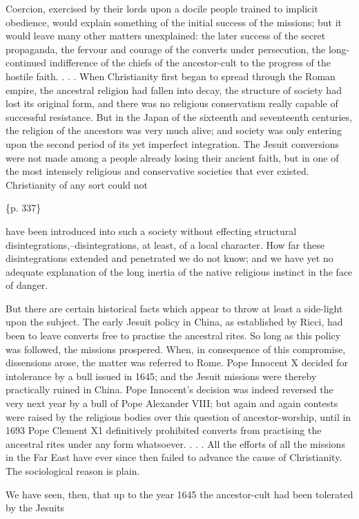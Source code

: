 Coercion, exercised by their lords upon a docile people trained to implicit obedience, would explain something of the initial success of the missions; but it would leave many other matters unexplained: the later success of the secret propaganda, the fervour and courage of the converts under persecution, the long-continued indifference of the chiefs of the ancestor-cult to the progress of the hostile faith. . . . When Christianity first began to spread through the Roman empire, the ancestral religion had fallen into decay, the structure of society had lost its original form, and there was no religious conservatism really capable of successful resistance. But in the Japan of the sixteenth and seventeenth centuries, the religion of the ancestors was very much alive; and society was only entering upon the second period of its yet imperfect integration. The Jesuit conversions were not made among a people already losing their ancient faith, but in one of the most intensely religious and conservative societies that ever existed. Christianity of any sort could not

\{p. 337\}

have been introduced into such a society without effecting structural disintegrations,--disintegrations, at least, of a local character. How far these disintegrations extended and penetrated we do not know; and we have yet no adequate explanation of the long inertia of the native religious instinct in the face of danger.

But there are certain historical facts which appear to throw at least a side-light upon the subject. The early Jesuit policy in China, as established by Ricci, had been to leave converts free to practise the ancestral rites. So long as this policy was followed, the missions prospered. When, in consequence of this compromise, dissensions arose, the matter was referred to Rome. Pope Innocent X decided for intolerance by a bull issued in 1645; and the Jesuit missions were thereby practically ruined in China. Pope Innocent's decision was indeed reversed the very next year by a bull of Pope Alexander VIII; but again and again contests were raised by the religious bodies over this question of ancestor-worship, until in 1693 Pope Clement X1 definitively prohibited converts from practising the ancestral rites under any form whatsoever. . . . All the efforts of all the missions in the Far East have ever since then failed to advance the cause of Christianity. The sociological reason is plain.

We have seen, then, that up to the year 1645 the ancestor-cult had been tolerated by the Jesuits

